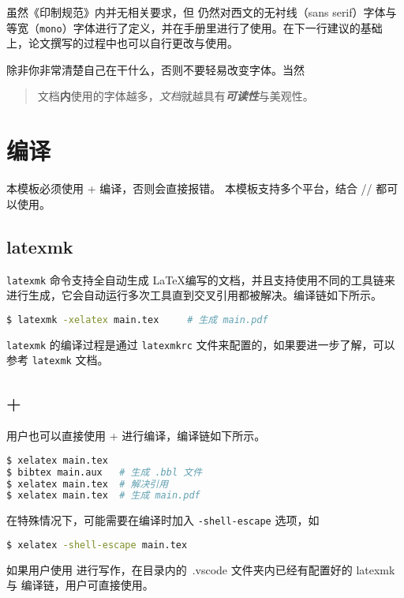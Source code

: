 \begin{notice}
    虽然《印制规范》内并无相关要求，但 \WhuThesis 仍然对西文的无衬线（\textsf{sans serif}）字体与等宽（\texttt{mono}）字体进行了定义，并在手册里进行了使用。在下一行建议的基础上，论文撰写的过程中也可以自行更改与使用。

    除非你非常清楚自己在干什么，否则不要轻易改变字体。当然\\
    \begin{quote}
        文档\textbf{内}{\tiny 使用}的字体越{\huge \textsf{多}}，\textit{文档}就越具有\textbf{\textit{可读性}}{\large 与}{\Large 美}{\huge 观}{\Huge 性}。
    \end{quote}
\end{notice}

\section{编译}
本模板必须使用  +  编译，否则会直接报错。 本模板支持多个平台，结合 // 都可以使用。

\subsection{latexmk}
\verb|latexmk| 命令支持全自动生成 \LaTeX 编写的文档，并且支持使用不同的工具链来进行生成，它会自动运行多次工具直到交叉引用都被解决。编译链如下所示。
\lstset{basicstyle=\ttfamily, breaklines=true}
\begin{lstlisting}[language=bash]
$ latexmk -xelatex main.tex     # 生成 main.pdf
\end{lstlisting}

\verb|latexmk| 的编译过程是通过 \verb|latexmkrc| 文件来配置的，如果要进一步了解，可以参考 \verb|latexmk| 文档。

\subsection{ + }
用户也可以直接使用  +  进行编译，编译链如下所示。
\begin{lstlisting}[language=bash]
$ xelatex main.tex  
$ bibtex main.aux   # 生成 .bbl 文件
$ xelatex main.tex  # 解决引用
$ xelatex main.tex  # 生成 main.pdf
\end{lstlisting}

在特殊情况下，可能需要在编译时加入 \verb|-shell-escape| 选项，如
\begin{lstlisting}[language=bash]
$ xelatex -shell-escape main.tex 
\end{lstlisting}

如果用户使用  进行写作，在目录内的\ .vscode 文件夹内已经有配置好的 latexmk 与  编译链，用户可直接使用。